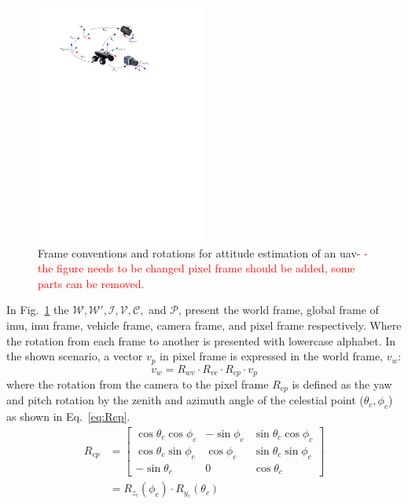\begin{figure}[h]
  \centering
  \includegraphics[width=0.5\textwidth]{./content/intro/figures/conventions.pdf}
  \caption{Frame conventions and rotations for attitude estimation of an
    \gls{uav}- \textcolor{red}{-the figure needs to be changed pixel frame
      should be added, some parts can be removed.}}
  \label{fig:rotation}
\end{figure}
In Fig.~\ref{fig:rotation} the $\mathcal{W}, \mathcal{W'}, \mathcal{I},
\mathcal{V}, \mathcal{C},$ and $\mathcal{P}$, present the world frame, global
frame of \gls{imu}, \gls{imu} frame, vehicle frame, camera frame, and pixel
frame respectively. Where the rotation from each frame to another is presented
with lowercase alphabet.
In the shown scenario, a vector $v_{p}$ in pixel frame is
expressed in the world frame, $v_{w}$:
\begin{equation}
  \label{eq:vinW}
  v_{w} = R_{wv} \cdot R_{vc} \cdot R_{cp} \cdot v_{p}
\end{equation}
\noindent where the rotation from the camera to the pixel frame $R_{cp}$ is
defined as the yaw and pitch rotation by the zenith and azimuth angle of the
celestial point ($\theta_c, \phi_c$) as shown in Eq.~\ref{eq:Rcp}.
\begin{equation}
  \label{eq:Rcp}
  \begin{split}
  R_{cp}  & =
  \begin{bmatrix}
    \cos\theta_{c}\cos\phi_{c} & -\sin\phi_{c} & \sin\theta_{c}\cos\phi_{c}\\
    \cos\theta_{c}\sin\phi_{c} & \cos\phi_{c} & \sin\theta_{c}\sin\phi_{c}\\
    -\sin\theta_{c} & 0 & \cos\theta_{c}
  \end{bmatrix}
  \\
  & = R_{z_{c}}(\phi_{c})\cdot R_{y_{c}}(\theta_{c})
  \end{split}
\end{equation}

